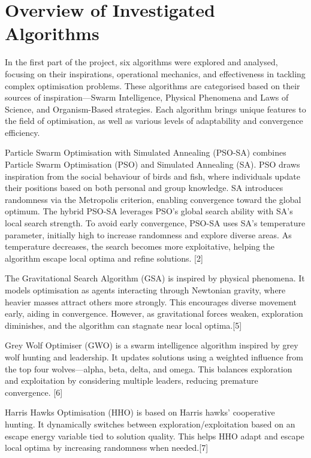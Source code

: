 \documentclass[a4paper, 12pt]{extarticle}
\begin{document}
\section{Overview of Investigated Algorithms}
In the first part of the project, six algorithms were explored and analysed, focusing on their inspirations, operational mechanics, and effectiveness in tackling complex optimisation problems. These algorithms are categorised based on their sources of inspiration—Swarm Intelligence, Physical Phenomena and Laws of Science, and Organism-Based strategies. Each algorithm brings unique features to the field of optimisation, as well as various levels of adaptability and convergence efficiency. 

Particle Swarm Optimisation with Simulated Annealing (PSO-SA) combines Particle Swarm Optimisation (PSO) and Simulated Annealing (SA). PSO draws inspiration from the social behaviour of birds and fish, where individuals update their positions based on both personal and group knowledge. SA introduces randomness via the Metropolis criterion, enabling convergence toward the global optimum. The hybrid PSO-SA leverages PSO's global search ability with SA's local search strength. To avoid early convergence, PSO-SA uses SA's temperature parameter, initially high to increase randomness and explore diverse areas. As temperature decreases, the search becomes more exploitative, helping the algorithm escape local optima and refine solutions. [2] 

The Gravitational Search Algorithm (GSA) is inspired by physical phenomena. It models optimisation as agents interacting through Newtonian gravity, where heavier masses attract others more strongly. This encourages diverse movement early, aiding in convergence. However, as gravitational forces weaken, exploration diminishes, and the algorithm can stagnate near local optima.[5] 

Grey Wolf Optimiser (GWO) is a swarm intelligence algorithm inspired by grey wolf hunting and leadership. It updates solutions using a weighted influence from the top four wolves—alpha, beta, delta, and omega. This balances exploration and exploitation by considering multiple leaders, reducing premature convergence. [6] 

Harris Hawks Optimisation (HHO) is based on Harris hawks' cooperative hunting. It dynamically switches between exploration/exploitation based on an escape energy variable tied to solution quality. This helps HHO adapt and escape local optima by increasing randomness when needed.[7] 
\end{document}
